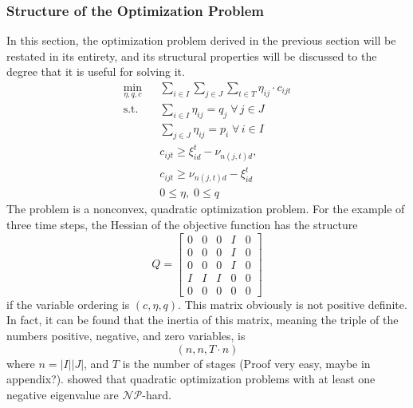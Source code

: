 \subsubsection{Structure of the Optimization Problem}
In this section, the optimization problem derived in the previous section will be restated in its entirety, and its structural properties will be discussed to the degree that it is useful for solving it.
\begin{eqnarray}
  \label{eq:full-nlp-restated-objecive}
  \min_{\eta, q, c}&&  \sum_{i\in I}\sum_{j\in J}\sum_{t\in T} \eta_{ij}\cdot c_{ijt}\\\label{eq:full-nlp-restated-q}
  \mathrm{s.t.}&&\sum_{i\in I}\eta_{ij} = q_j \;\forall\, j\in J\\
  \label{eq:full-nlp-restated-p}
  &&\sum_{j\in J}\eta_{ij} = p_i \;\forall\, i\in I\\
  \label{eq:full-nlp-restated-ineq1}
  &&c_{ijt} \geq \xi_{id}^t - \nu_{n(j,t)d},\\
  \label{eq:full-nlp-restated-ineq2}
  &&c_{ijt} \geq \nu_{n(j,t)d} - \xi_{id}^t\\ 
  &&0 \leq \eta,\; 0\leq q
\end{eqnarray}
The problem is a nonconvex, quadratic optimization problem. For the example of three time steps, the Hessian of the objective function has the structure
\begin{equation}
  \label{eq:structure-of-quadratic-hessian}
  Q = \left[\begin{array}{ccccc}
      0&0&0&I&0\\0&0&0&I&0\\0&0&0&I&0\\I&I&I&0&0\\0&0&0&0&0
    \end{array}\right]
\end{equation}
if the variable ordering is $(c,\eta, q)$. This matrix obviously is not positive definite. In fact, it can be found that the inertia of this matrix, meaning the triple of the numbers positive, negative, and zero variables, is
\begin{equation}
  \label{eq:inertia-of-hessian}
  \left(n, n, T\cdot n\right)
\end{equation}
where $n=|I||J|$, and $T$ is the number of stages (Proof very easy, maybe in appendix?). \cite{Pardalos1991} showed that quadratic optimization problems with at least one negative eigenvalue are $\mathcal{NP}$-hard.
